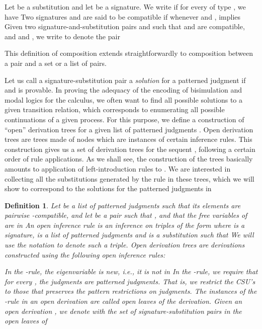 \documentclass{acmtrans2m}
\newenvironment{definition}{\begin{define} \rm}{\end{define}}
\newtheorem{define}[theorem]{Definition}
\newcommand{\ie}{{\em i.e.}}
\begin{document}
Let  be a substitution and let  be a signature.
We write  if for every  of type ,
we have  
Two signatures  and  are said to be compatible
if whenever  and , 
 implies 
Given two signature-and-substitution pairs 
 and  such that  and 
are compatible, and  and , 
we write  to denote the pair
 
This definition of composition extends straightforwardly
to composition between a pair and a set or a list of pairs. 

Let us call a  signature-substitution pair  a {\em solution}
for a patterned judgment  if  and 
 is provable. 
In proving the adequacy of the encoding of bisimulation and
modal logics for the  calculus, we often want to find
all possible solutions to a given transition relation, which
corresponds to enumerating all possible continuations of
a given process. 
For this purpose, we define a construction of ``open'' derivation 
trees for a given list of patterned judgments . Open derivation trees 
are trees made of nodes which are instances of certain inference rules. 
This construction gives us a set of derivation trees for the 
sequent , following a certain order of rule applications. 
As we shall see, the construction of the trees basically amounts to 
application of left-introduction rules to . We are interested 
in collecting all the substitutions generated by the  rule
in these trees, which we will show to correspond 
to the solutions for the patterned judgments in 

\begin{definition}
\label{def:patterned-judgment}
Let  be a list of patterned judgments such that its elements are
pairwise -compatible, and let  be a pair 
such that , and that the free variables of  are in 
An {\em open inference rule} is an inference on triples of the form
 where  is a signature,  is a list of patterned
judgments and  is a substitution such that 
We will use the notation  to denote such a triple.
{\em Open derivation trees} are derivations constructed using 
the following open inference rules:



In the -rule, the eigenvariable  is new, \ie, it is not in 
In the -rule, we require that for every ,
the judgments  are patterned judgments. 
That is, we restrict the CSU's to those that preserves the pattern
restrictions on judgments.
The instances of the -rule in an open derivation are 
called {\em open leaves} of the derivation. 
Given an open derivation , we denote with  the set of 
signature-substitution pairs in the open leaves of  
\end{definition}
\end{document}
